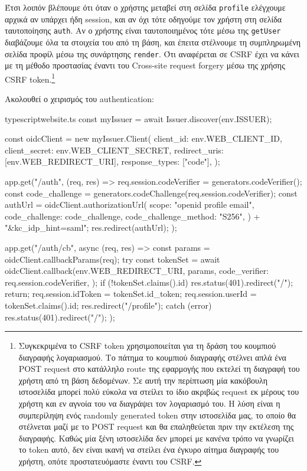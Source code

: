 \documentclass[../thesis.tex]{subfiles}
\begin{document}
Έτσι λοιπόν βλέπουμε ότι όταν ο χρήστης μεταβεί στη σελίδα \verb|profile| ελέγχουμε αρχικά αν υπάρχει ήδη session, και αν όχι τότε οδηγούμε τον χρήστη στη σελίδα ταυτοποίησης \verb|auth|.
Αν ο χρήστης είναι ταυτοποιημένος τότε μέσω της \verb|getUser| διαβάζουμε όλα τα στοιχεία του από τη βάση, και έπειτα στέλνουμε τη συμπληρωμένη σελίδα προφίλ μέσω της συνάρτησης \verb|render|.
Ότι αναφέρεται σε CSRF έχει να κάνει με τη μέθοδο προστασίας έναντι του Cross-site request forgery μέσω της χρήσης CSRF token.\footnote{Συγκεκριμένα το CSRF token χρησιμοποιείται για τη δράση του κουμπιού διαγραφής λογαριασμού. Το πάτημα το κουμπιού διαγραφής στέλνει απλά ένα POST request στο κατάλληλο route της εφαρμογής που εκτελεί τη διαγραφή του χρήστη από τη βάση δεδομένων. Σε αυτή την περίπτωση μία κακόβουλη ιστοσελίδα μπορεί πολύ εύκολα να στείλει το ίδιο ακριβώς request εκ μέρους του χρήστη και εν αγνοία του να διαγράψει τον λογαριασμό του. Η λύση είναι η συμπερίληψη ενός randomly generated token στην ιστοσελίδα μας, το οποίο θα στέλνεται μαζί με το POST request και θα επαληθεύεται πριν την εκτέλεση της διαγραφής. Καθώς μία ξένη ιστοσελίδα δεν μπορεί με κανένα τρόπο να γνωρίζει το token αυτό, δεν είναι ικανή να στείλει ένα έγκυρο αίτημα διαγραφής του χρήστη, οπότε προστατευόμαστε έναντι του CSRF.}

Ακολουθεί ο χειρισμός του authentication:

\begin{codeblock}{typescript}{website.ts}
  const myIssuer = await Issuer.discover(env.ISSUER);

  const oidcClient = new myIssuer.Client({
    client_id: env.WEB_CLIENT_ID,
    client_secret: env.WEB_CLIENT_SECRET,
    redirect_uris: [env.WEB_REDIRECT_URI],
    response_types: ["code"],
  });

  app.get("/auth", (req, res) => {
    req.session.codeVerifier = generators.codeVerifier();
    const code_challenge = generators.codeChallenge(req.session.codeVerifier);
    const authUrl =
      oidcClient.authorizationUrl({
        scope: "openid profile email",
        code_challenge: code_challenge,
        code_challenge_method: "S256",
      }) + "&kc_idp_hint=saml";
    res.redirect(authUrl);
  });

  app.get("/auth/cb", async (req, res) => {
    const params = oidcClient.callbackParams(req);
    try {
      const tokenSet = await oidcClient.callback(env.WEB_REDIRECT_URI, params, {
        code_verifier: req.session.codeVerifier,
      });
      if (!tokenSet.claims().id) {
        res.status(401).redirect("/");
        return;
      }
      req.session.idToken = tokenSet.id_token;
      req.session.userId = tokenSet.claims().id;
      res.redirect("/profile");
    } catch (error) {
      res.status(401).redirect("/");
    }
  });
\end{codeblock}
\end{document}
